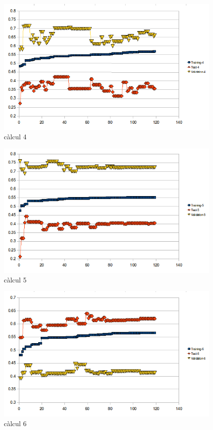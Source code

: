 \begin{figure}[h]
\begin{center}
\includegraphics[scale=0.75]{pholus/pholus4.png}
\end{center}
\caption{càlcul 4}
\label{fig:pholusResult4}
\end{figure}

\begin{figure}[h]
\begin{center}
\includegraphics[scale=0.75]{pholus/pholus5.png}
\end{center}
\caption{càlcul 5}
\label{fig:pholusResult5}
\end{figure}

\begin{figure}[h]
\begin{center}
\includegraphics[scale=0.75]{pholus/pholus6.png}
\end{center}
\caption{càlcul 6}
\label{fig:pholusResult6}
\end{figure}


